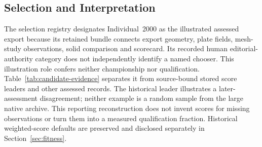 \subsection{Selection and Interpretation}
The selection registry designates Individual~2000 as the illustrated assessed export because its retained bundle connects export geometry, plate fields, mesh-study observations, solid comparison and scorecard. Its recorded human editorial-authority category does not independently identify a named chooser. This illustration role confers neither championship nor qualification. Table~\ref{tab:candidate-evidence} separates it from source-bound stored score leaders and other assessed records. The historical leader illustrates a later-assessment disagreement; neither example is a random sample from the large native archive. This reporting reconstruction does not invent scores for missing observations or turn them into a measured qualification fraction. Historical weighted-score defaults are preserved and disclosed separately in Section~\ref{sec:fitness}.
